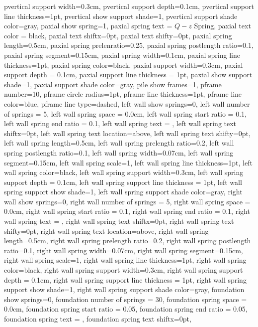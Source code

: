 {{pvertical support width=0.3cm,
pvertical support depth=0.1cm,
pvertical support line thickness=1pt,
pvertical show support shade=1,
pvertical support shade color=gray,
paxial show spring=1,
paxial spring text = {$Q-z$ Spring},
paxial text color = black,
paxial text shiftx=0pt,
paxial text shifty=0pt,
paxial spring length=0.5cm,
paxial spring prelenratio=0.25,
paxial spring postlength ratio=0.1,
paxial spring segment=0.15cm,
paxial spring width=0.1cm,
paxial spring line thickness=1pt,
paxial spring color=black,
paxial support width=0.3cm,
paxial support depth = 0.1cm,
paxial support line thickness = 1pt,
paxial show support shade=1,
paxial support shade color=gray,
pile show frames=1,
pframe number=10,
pframe circle radius=1pt,
pframe line thickness=1pt,
pframe line color=blue,
pframe line type=dashed,
left wall show springs=0,
left wall number of springs = 5,
left wall spring space = 0.0cm,
left wall spring start ratio = 0.1,
left wall spring end ratio = 0.1,
left wall spring text = {},
left wall spring text shiftx=0pt,
left wall spring text location=above,
left wall spring text shifty=0pt,
left wall spring length=0.5cm,
left wall spring prelength ratio=0.2,
left wall spring postlength ratio=0.1,
left wall spring width=0.07cm,
left wall spring segment=0.15cm,
left wall spring scale=1,
left wall spring line thickness=1pt,
left wall spring color=black,
left wall spring support width=0.3cm,
left wall spring support depth = 0.1cm,
left wall spring support line thickness = 1pt,
left wall spring support show shade=1,
left wall spring support shade color=gray,
right wall show springs=0,
right wall number of springs = 5,
right wall spring space = 0.0cm,
right wall spring start ratio = 0.1,
right wall spring end ratio = 0.1,
right wall spring text = {},
right wall spring text shiftx=0pt,
right wall spring text shifty=0pt,
right wall spring text location=above,
right wall spring length=0.5cm,
right wall spring prelength ratio=0.2,
right wall spring postlength ratio=0.1,
right wall spring width=0.07cm,
right wall spring segment=0.15cm,
right wall spring scale=1,
right wall spring line thickness=1pt,
right wall spring color=black,
right wall spring support width=0.3cm,
right wall spring support depth = 0.1cm,
right wall spring support line thickness = 1pt,
right wall spring support show shade=1,
right wall spring support shade color=gray,
foundation show springs=0,
foundation number of springs = 30,
foundation spring space = 0.0cm,
foundation spring start ratio = 0.05,
foundation spring end ratio = 0.05,
foundation spring text = {},
foundation spring text shiftx=0pt,
}}
